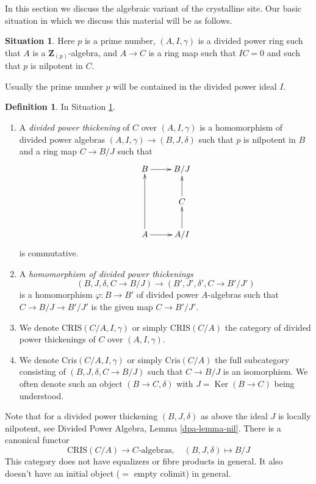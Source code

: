 \documentclass{stacks-project}
\theoremstyle{plain}
\theoremstyle{definition}
\newtheorem{definition}[subsection]{Definition}
\newtheorem{situation}[subsection]{Situation}
\theoremstyle{remark}
\numberwithin{equation}{subsection}
\def\Ker{\mathop{\mathrm{Ker}}}
\begin{document}
\noindent
In this section we discuss the algebraic variant of the crystalline site.
Our basic situation in which we discuss this material will be as
follows.

\begin{situation}
\label{situation-affine}
Here $p$ is a prime number, $(A, I, \gamma)$ is a divided power
ring such that $A$ is a $\mathbf{Z}_{(p)}$-algebra, and $A \to C$ is a
ring map such that $IC = 0$ and such that $p$ is nilpotent in $C$.
\end{situation}

\noindent
Usually the prime number $p$ will be contained in the
divided power ideal $I$.

\begin{definition}
\label{definition-affine-thickening}
In Situation \ref{situation-affine}.
\begin{enumerate}
\item A {\it divided power thickening} of $C$ over $(A, I, \gamma)$
is a homomorphism of divided power algebras $(A, I, \gamma) \to (B, J, \delta)$
such that $p$ is nilpotent in $B$ and a ring map $C \to B/J$ such that
$$
\xymatrix{
B \ar[r] & B/J \\
& C \ar[u] \\
A \ar[uu] \ar[r] & A/I \ar[u]
}
$$
is commutative.
\item A {\it homomorphism of divided power thickenings}
$$
(B, J, \delta, C \to B/J) \longrightarrow (B', J', \delta', C \to B'/J')
$$
is a homomorphism $\varphi : B \to B'$ of divided power $A$-algebras such
that $C \to B/J \to B'/J'$ is the given map $C \to B'/J'$.
\item We denote $\text{CRIS}(C/A, I, \gamma)$ or simply $\text{CRIS}(C/A)$
the category of divided power thickenings of $C$ over $(A, I, \gamma)$.
\item We denote $\text{Cris}(C/A, I, \gamma)$ or simply $\text{Cris}(C/A)$
the full subcategory consisting of $(B, J, \delta, C \to B/J)$ such that
$C \to B/J$ is an isomorphism. We often denote such an object
$(B \to C, \delta)$ with $J = \Ker(B \to C)$ being understood.
\end{enumerate}
\end{definition}

\noindent
Note that for a divided power thickening $(B, J, \delta)$ as above
the ideal $J$ is locally nilpotent, see
Divided Power Algebra, Lemma \ref{dpa-lemma-nil}.
There is a canonical functor
\begin{equation}
\label{equation-forget-affine}
\text{CRIS}(C/A) \longrightarrow C\text{-algebras},\quad
(B, J, \delta) \longmapsto B/J
\end{equation}
This category does not have equalizers or fibre products in general.
It also doesn't have an initial object ($=$ empty colimit) in general.
\end{document}
